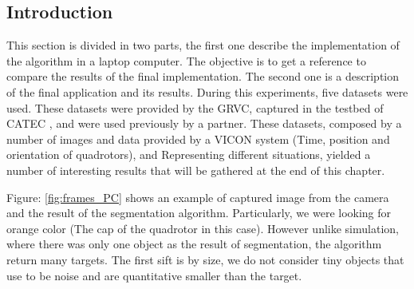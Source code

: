 \subsection{Introduction}
	This section is divided in two parts, the first one describe the implementation of the algorithm in a laptop computer. The objective is to get a reference to compare the results of the final implementation. The second one is a description of the final application and its results.
	During this experiments, five datasets were used. These datasets were provided by the GRVC, captured in the testbed of CATEC \cite{CATEC}, and were used previously by a partner. These datasets, composed by a number of images and data provided by a VICON system (Time, position and orientation of quadrotors), and Representing different situations, yielded a number of interesting results that will be gathered at the end of this chapter. 

	Figure: \ref{fig:frames_PC} shows an example of captured image from the camera and the result of the segmentation algorithm. Particularly, we were looking for orange color (The cap of the quadrotor in this case). However unlike simulation, where there was only one object as the result of segmentation, the algorithm return many targets. The first sift is by size, we do not consider tiny objects that use to be noise and are quantitative smaller than the target.
		
